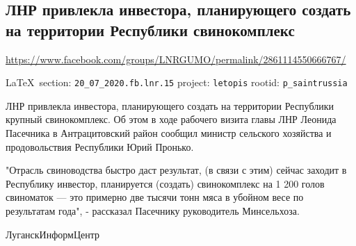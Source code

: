  
 
\subsection{ЛНР привлекла инвестора, планирующего создать на территории Республики свинокомплекс}
\label{sec:20_07_2020.fb.lnr.15}
\url{https://www.facebook.com/groups/LNRGUMO/permalink/2861114550666767/}
  
\vspace{0.5cm}
{\small\LaTeX~section: \verb|20_07_2020.fb.lnr.15| project: \verb|letopis| rootid: \verb|p_saintrussia|}
\vspace{0.5cm}
  
ЛНР привлекла инвестора, планирующего создать на территории Республики крупный
свинокомплекс. Об этом в ходе рабочего визита главы ЛНР Леонида Пасечника в
Антрацитовский район сообщил министр сельского хозяйства и продовольствия
Республики Юрий Пронько.

"Отрасль свиноводства быстро даст результат, (в связи с этим) сейчас заходит в
Республику инвестор, планируется (создать) свинокомплекс на 1 200 голов
свиноматок --- это примерно две тысячи тонн мяса в убойном весе по результатам
года", - рассказал Пасечнику руководитель Минсельхоза.

ЛуганскИнформЦентр

